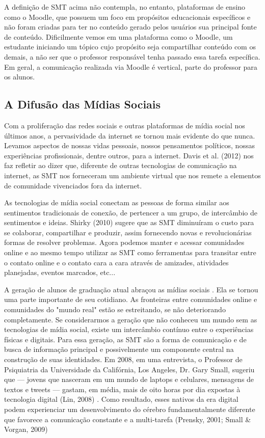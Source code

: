 A definição de SMT acima não contempla, no entanto, plataformas de ensino como o
Moodle, que possuem um foco em propósitos educacionais específicos e não foram
criadas para ter no conteúdo gerado pelos usuários sua principal fonte de
conteúdo. Dificilmente vemos em uma plataforma como o Moodle, um estudante
iniciando um tópico cujo propósito seja compartilhar conteúdo com os demais, a
não ser que o professor responsável tenha passado essa tarefa específica. Em
geral, a comunicação realizada via Moodle é vertical, parte do professor para os
alunos.

\subsection{A Difusão das Mídias Sociais}

Com a proliferação das redes sociais e outras plataformas de mídia social nos
últimos anos, a pervasividade da internet se tornou mais evidente do que nunca.
Levamos aspectos de nossas vidas pessoais, nossos pensamentos políticos, nossas
experiências profissionais, dentre outros, para a internet. Davis et al. (2012)
nos faz refletir ao dizer que, diferente de outras tecnologias de comunicação na
internet, as SMT nos forneceram um ambiente virtual que nos remete a elementos de
comunidade vivenciados fora da internet.

As tecnologias de mídia social conectam as pessoas de forma similar aos sentimentos
tradicionais de conexão, de pertencer a um grupo, de intercâmbio de sentimentos
e ideias. Shirky (2010)
sugere que as SMT diminuíram o custo para se colaborar, compartilhar e produzir,
assim fornecendo novas e revolucionárias formas de resolver problemas. Agora
podemos manter e acessar comunidades online e ao mesmo tempo utilizar as SMT
como ferramentas para transitar entre o contato online e o contato cara a cara
através de amizades, atividades planejadas, eventos marcados, etc...

A geração de alunos de graduação atual abraçou as mídias sociais . Ela se tornou
uma parte importante de seu cotidiano. As fronteiras entre comunidades
online e comunidades do "mundo real" estão se estreitando, se não deteriorando
completamente. Se considerarmos a geração que não conheceu um mundo sem as
tecnologias de mídia social, existe um intercâmbio contínuo entre o experiências
físicas e digitais. Para essa geração, as SMT são a forma de comunicação e de
busca de informação principal e possivelmente um componente central na construção
de suas identidades.
Em 2008, em uma entrevista, o Professor de Psiquiatria da Universidade da Califórnia,
Los Angeles, Dr. Gary Small, sugeriu que — jovens que nasceram em um mundo de laptops
e celulares, mensagens de textos e tweets — gastam, em média, mais de oito horas
por dia expostas à tecnologia digital (Lin, 2008)
. Como resultado,
esses nativos da era digital podem experienciar um desenvolvimento do cérebro
fundamentalmente diferente que favorece a comunicação constante e a multi-tarefa
(Prensky, 2001; Small \& Vorgan, 2009)

